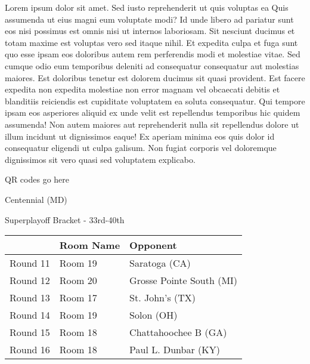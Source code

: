 \documentclass{article}%
\begin{document}
\vspace*{8pt}%
\linebreak%
\newline%
\newline%
    Lorem ipsum dolor sit amet. Sed iusto reprehenderit ut quis voluptas ea Quis assumenda ut eius magni eum voluptate modi? Id unde libero ad pariatur sunt eos nisi possimus est omnis nisi ut internos laboriosam. Sit nesciunt ducimus et totam maxime est voluptas vero sed itaque nihil. Et expedita culpa et fuga sunt quo esse ipsam eos doloribus autem rem perferendis modi et molestiae vitae.\newline%
\newline%
    Sed cumque odio eum temporibus deleniti ad consequatur consequatur aut molestias maiores. Est doloribus tenetur est dolorem ducimus sit quasi provident. Est facere expedita non expedita molestiae non error magnam vel obcaecati debitis et blanditiis reiciendis est cupiditate voluptatem ea soluta consequatur. Qui tempore ipsam eos asperiores aliquid ex unde velit est repellendus temporibus hic quidem assumenda!\newline%
\newline%
    Non autem maiores aut reprehenderit nulla sit repellendus dolore ut illum incidunt ut dignissimos eaque! Ex aperiam minima eos quis dolor id consequatur eligendi ut culpa galisum. Non fugiat corporis vel doloremque dignissimos sit vero quasi sed voluptatem explicabo.\newline%
\newline%
\vspace*{30pt}%
\begin{center}%
\begin{Huge}%
QR codes go here%
\end{Huge}%
\end{center}%
\newpage%
\begin{center}%
\begin{Huge}%
Centennial (MD)%
\end{Huge}%
\vspace*{8pt}%
\linebreak%
\begin{Large}%
Superplayoff Bracket {-} 33rd{-}40th%
\end{Large}%
\end{center}%
%
\begin{tabularx}{\textwidth}{|c|Y|Y|}%
\hline%
&Room Name&Opponent\\%
\hline%
Round 11&Room 19&Saratoga (CA)\\%
Round 12&Room 20&Grosse Pointe South (MI)\\%
Round 13&Room 17&St. John's (TX)\\%
Round 14&Room 19&Solon (OH)\\%
Round 15&Room 18&Chattahoochee B (GA)\\%
Round 16&Room 18&Paul L. Dunbar (KY)\\%
\hline%
\end{tabularx}%
\end{document}
